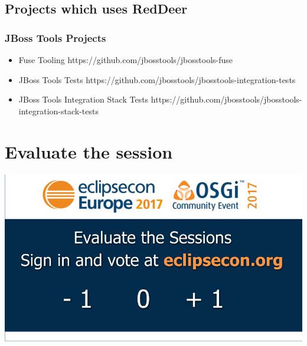 \documentclass{beamer}
\begin{document}
\subsection{Projects which uses RedDeer}
\begin{frame}[fragile]
\frametitle{JBoss Tools Projects}
\begin{itemize}
\item Fuse Tooling \newline
  https://github.com/jbosstools/jbosstools-fuse
\item JBoss Tools Tests \newline
  https://github.com/jbosstools/jbosstools-integration-tests
\item JBoss Tools Integration Stack Tests \newline
  https://github.com/jbosstools/jbosstools-integration-stack-tests
\end{itemize}
\end{frame}

\section{Evaluate the session}
\begin{frame}[fragile]
\begin{center}
\includegraphics[width=\textwidth,height=0.8\textheight,keepaspectratio]{SpeakerEvalSlide-16-9-2017.png}
\end{center}
\end{frame}
\end{document}
